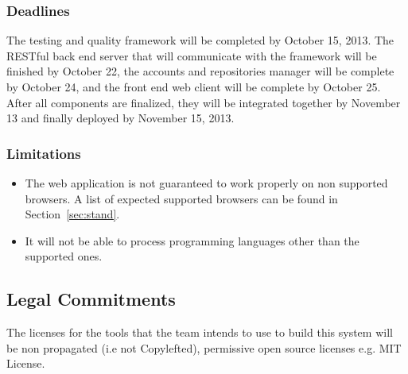 \subsubsection*{Deadlines}

The testing and quality framework will be completed by October 15, 2013. The
RESTful back end server that will communicate with the framework will be
finished by October 22, the accounts and repositories manager will be complete
by October 24, and the front end web client will be complete by October 25.
After all components are finalized, they will be integrated together by November
13 and finally deployed by November 15, 2013.

\subsubsection*{Limitations}
\begin{itemize}
\item The web application is not guaranteed to work properly on non supported
browsers. A list of expected supported browsers can be found in Section~\ref{sec:stand}.
\item It will not be able to process programming languages other than the
supported ones.
\end{itemize}

\subsection{Legal Commitments}

The licenses for the tools that the team intends to use to build this system
will be non propagated (i.e not Copylefted), permissive open source licenses
e.g. MIT License.